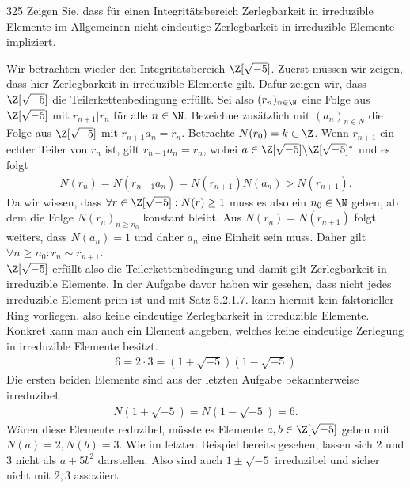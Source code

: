 \begin{algebraUE}{325}
Zeigen Sie, dass für einen Integritätsbereich Zerlegbarkeit in
irreduzible Elemente im Allgemeinen nicht eindeutige Zerlegbarkeit in
irreduzible Elemente impliziert.
\end{algebraUE}
\begin{solution}
Wir betrachten wieder den Integritätsbereich $\Z[\sqrt{-5}]$.
Zuerst müssen wir zeigen, dass hier Zerlegbarkeit in irreduzible Elemente gilt.
Dafür zeigen wir, dass $\Z[\sqrt{-5}]$ die Teilerkettenbedingung erfüllt.
Sei also $(r_n)_{n \in \N}$ eine Folge aus $\Z[\sqrt{-5}]$ mit $r_{n+1} | r_n$
für alle $n \in \N$. Bezeichne zusätzlich mit $(a_n)_{n \in N}$ die Folge aus $\Z[\sqrt{-5}]$
mit $r_{n+1}a_n = r_n$.
Betrachte $N(r_0) = k \in \Z$. Wenn $r_{n+1}$ ein echter Teiler
von $r_n$ ist, gilt $r_{n+1}a_n = r_n$, wobei $a \in \Z[\sqrt{-5}]\backslash \Z[\sqrt{-5}]^*$ und es folgt
\begin{align*}
  N(r_n) = N(r_{n+1}a_n) = N(r_{n+1})N(a_n) > N(r_{n+1}).
\end{align*}
Da wir wissen, dass $\forall r \in \Z[\sqrt{-5}]: N(r) \geq 1$ muss es also ein $n_0 \in \N$
geben, ab dem die Folge $N(r_n)_{n \geq n_0}$ konstant bleibt.
Aus $N(r_n) = N(r_{n+1})$ folgt weiters, dass $N(a_n) = 1$ und daher $a_n$
eine Einheit sein muss. Daher gilt $\forall n \geq n_0: r_n \sim r_{n+1}$. \\
$\Z[\sqrt{-5}]$ erfüllt also die Teilerkettenbedingung und damit gilt Zerlegbarkeit
in irreduzible Elemente. In der Aufgabe davor haben wir gesehen, dass nicht jedes
irreduzible Element prim ist und mit Satz 5.2.1.7. kann hiermit kein faktorieller
Ring vorliegen, also keine eindeutige Zerlegbarkeit in irreduzible Elemente.
Konkret kann man auch ein Element angeben, welches keine eindeutige
Zerlegung in irreduzible Elemente besitzt.
\begin{align*}
  6 = 2\cdot3 = (1 + \sqrt{-5})(1 - \sqrt{-5})
\end{align*}
Die ersten beiden Elemente sind aus der letzten Aufgabe bekannterweise irreduzibel.
\begin{align*}
  N(1 + \sqrt{-5}) = N(1 - \sqrt{-5}) = 6.
\end{align*}
Wären diese Elemente reduzibel, müsste es Elemente $a,b \in \Z[\sqrt{-5}]$
geben mit $N(a) = 2, N(b) = 3$.
Wie im letzten Beispiel bereits gesehen, lassen sich $2$ und $3$ nicht als $a + 5b^2$
darstellen. Also sind auch $1 \pm \sqrt{-5}$ irreduzibel und sicher nicht mit $2,3$
assoziiert.
\end{solution}
